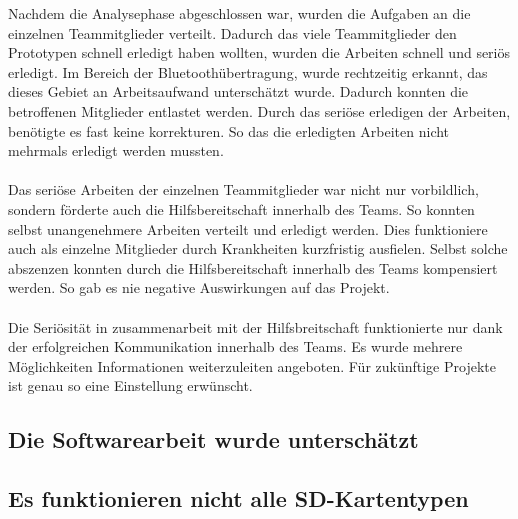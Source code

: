 Nachdem die Analysephase abgeschlossen war, wurden die Aufgaben an die einzelnen Teammitglieder verteilt. 
Dadurch das viele Teammitglieder den Prototypen schnell erledigt haben wollten, wurden die Arbeiten schnell und seriös erledigt. Im Bereich der Bluetoothübertragung, wurde rechtzeitig erkannt, das dieses Gebiet an Arbeitsaufwand unterschätzt wurde. Dadurch konnten die betroffenen Mitglieder entlastet werden. Durch das seriöse erledigen der Arbeiten, benötigte es fast keine korrekturen. So das die erledigten Arbeiten nicht mehrmals erledigt werden mussten.\\
\\
Das seriöse Arbeiten der einzelnen Teammitglieder war nicht nur vorbildlich, sondern förderte auch die Hilfsbereitschaft innerhalb des Teams. So konnten selbst unangenehmere Arbeiten verteilt und erledigt werden. Dies funktioniere auch als einzelne Mitglieder durch Krankheiten kurzfristig ausfielen. Selbst solche abszenzen konnten durch die Hilfsbereitschaft innerhalb des Teams kompensiert werden. So gab es nie negative Auswirkungen auf das Projekt.\\
\\
Die Seriösität in zusammenarbeit mit der Hilfsbreitschaft funktionierte nur dank der erfolgreichen Kommunikation innerhalb des Teams. Es wurde mehrere Möglichkeiten Informationen weiterzuleiten angeboten. Für zukünftige Projekte ist genau so eine Einstellung erwünscht. 

\subsection{Die Softwarearbeit wurde unterschätzt}


\subsection{Es funktionieren nicht alle SD-Kartentypen}
